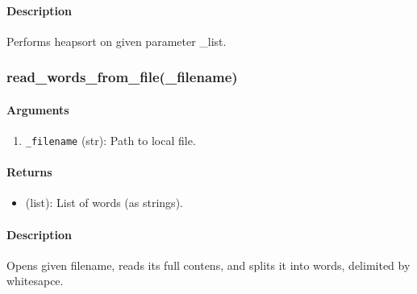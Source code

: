 \paragraph*{Description}
Performs heapsort on given parameter \_list.
\subsubsection{read\_words\_from\_file(\_filename)}
\paragraph*{Arguments}
\begin{enumerate}
    \item \texttt{\_filename} (str): Path to local file.
\end{enumerate}
\paragraph*{Returns}
\begin{itemize}
    \item (list): List of words (as strings).
\end{itemize}
\paragraph*{Description}
Opens given filename, reads its full contens, and splits it into words, delimited by whitesapce.
